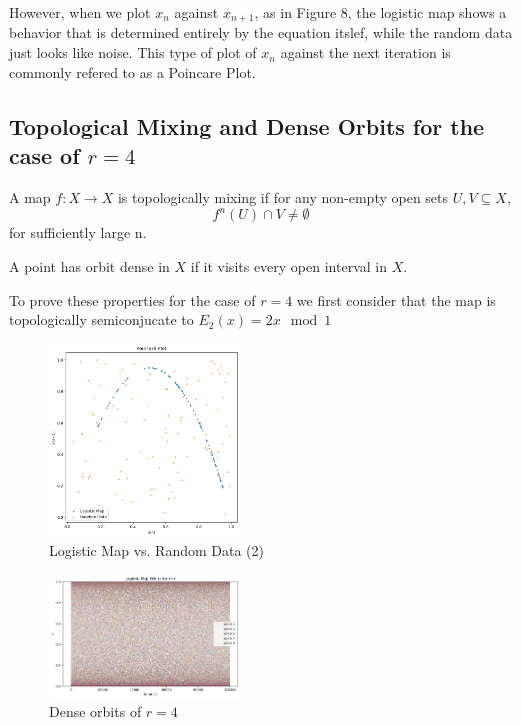 \documentclass[11pt,twocolumn]{article}
\begin{document}
However, when we plot $x_n$ against $x_{n+1}$, as in Figure 8, the logistic map shows a behavior that is determined entirely by the equation itslef, while the random data just looks like noise.
This type of plot of $x_n$ against the next iteration is commonly refered to as a Poincare Plot.

\subsection{Topological Mixing and Dense Orbits for the case of $r=4$}
A map $f:X\to X$ is topologically mixing if for any non-empty open sets $U,V\subseteq X$,
\[f^n(U)\cap V\neq \emptyset\]
for sufficiently large n.

A point has orbit dense in $X$ if it visits every open interval in $X$.


To prove these properties for the case of $r=4$ we first consider that the map is topologically semiconjucate to $E_2(x)=2x\mod 1$
\begin{figure}
    \centering
\includegraphics[width=0.45\textwidth]{figures/Poincare.png}
    \caption{Logistic Map vs. Random Data (2)}
    \label{fig:enter-label}
\end{figure}
\begin{figure}
    \centering
\includegraphics[width=0.45\textwidth]{figures/denseorbits.png.png}
    \caption{Dense orbits of $r=4$}
    \label{fig:enter-label}
\end{figure}
\end{document}
